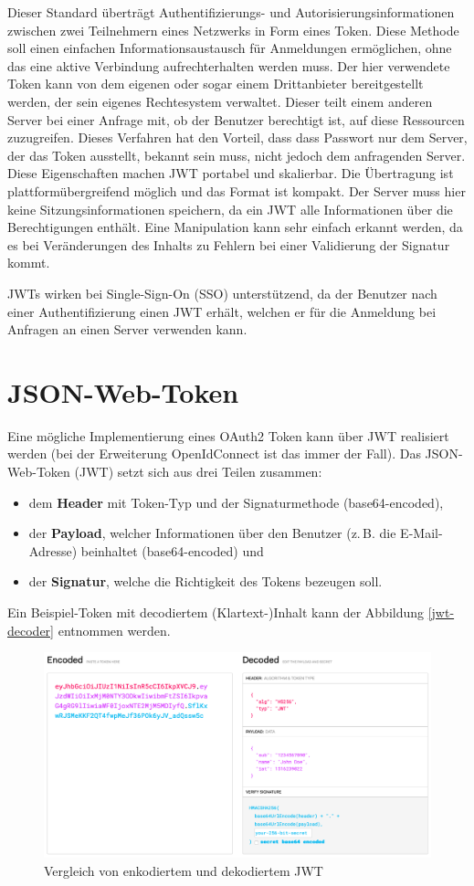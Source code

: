 Dieser Standard überträgt Authentifizierungs- und Autorisierungsinformationen zwischen zwei Teilnehmern eines Netzwerks in Form eines Token.
Diese Methode soll einen einfachen Informationsaustausch für Anmeldungen ermöglichen, ohne das eine aktive Verbindung aufrechterhalten werden muss.
Der hier verwendete Token kann von dem eigenen oder sogar einem Drittanbieter bereitgestellt werden, der sein eigenes Rechtesystem verwaltet. 
Dieser teilt einem anderen Server bei einer Anfrage mit, ob der Benutzer berechtigt ist, auf diese Ressourcen zuzugreifen.
Dieses Verfahren hat den Vorteil, dass dass Passwort nur dem Server, der das Token ausstellt, bekannt sein muss, nicht jedoch dem anfragenden Server.
Diese Eigenschaften machen JWT portabel und skalierbar. 
Die Übertragung ist plattformübergreifend möglich und das Format ist kompakt. 
Der Server muss hier keine Sitzungsinformationen speichern, da ein JWT alle Informationen über die Berechtigungen enthält. 
Eine Manipulation kann sehr einfach erkannt werden, da es bei Veränderungen des Inhalts zu Fehlern bei einer Validierung der Signatur kommt.\cite{ionos-jwt}

JWTs wirken bei Single-Sign-On (SSO) unterstützend, da der Benutzer nach einer Authentifizierung einen JWT erhält, welchen er für die Anmeldung bei Anfragen an einen Server verwenden kann.

\section{JSON-Web-Token}
Eine mögliche Implementierung eines OAuth2 Token kann über JWT realisiert werden (bei der Erweiterung OpenIdConnect ist das immer der Fall).
Das JSON-Web-Token (JWT) setzt sich aus drei Teilen zusammen: 
\begin{itemize}
	\item dem \textbf{Header} mit Token-Typ und der Signaturmethode (base64-encoded),
	\item der \textbf{Payload}, welcher Informationen über den Benutzer (z.\,B. die E-Mail-Adresse) beinhaltet (base64-encoded) und 
	\item der \textbf{Signatur}, welche die Richtigkeit des Tokens bezeugen soll.\cite{jwt}
\end{itemize}

\noindent Ein Beispiel-Token mit decodiertem (Klartext-)Inhalt kann der Abbildung \vref{jwt-decoder} entnommen werden.

\begin{figure}[ht]
	\centering
	\includegraphics[width=.85\linewidth]{jwt.png}
	\caption{Vergleich von enkodiertem und dekodiertem JWT}
	\label{jwt-decoder}
\end{figure}

